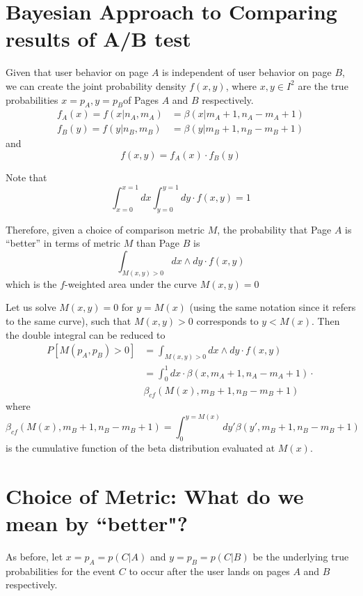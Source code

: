 \documentclass[12pt]{report}
\newcommand{\beq}{\begin{equation}} %
\newcommand{\eeq}{\end{equation}} %
\newcommand{\bdm}{\begin{displaymath}} %
\newcommand{\edm}{\end{displaymath}} %
\begin{document}
\section{Bayesian Approach to Comparing results of A/B test}\label{sec:bayesianab}
Given that user behavior on page \(A\) is independent of user behavior on
page \(B\), we
can create the joint probability density \(f(x, y)\), where \(x, y \in
I^2\) are the true probabilities \(x=p_A,y=p_B\)of Pages \(A\) and \(B\)
respectively.
\beq
\begin{split}
f_A(x)=f(x|n_A,m_A) &= \beta(x|m_A+1, n_A-m_A+1)\\ f_B(y)=f(y|n_B,m_B)
&= \beta(y|m_B+1, n_B-m_B+1)
\end{split}
\eeq
and
\bdm
f(x,y) = f_A(x)\cdot f_B(y)
\edm

Note that
\beq\label{eq:norm}
\int_{x=0}^{x=1} dx\int_{y=0}^{y=1} dy \cdot f(x, y) = 1
\eeq

Therefore, given a choice of comparison metric \(M\),
the probability that Page \(A\) is
``better'' in terms of metric \(M\) than Page \(B\) is 
\bdm
\int_{M(x,y)>0}dx \wedge dy \cdot f(x, y) \edm which is the \(f\)-weighted
area under the curve \(M(x,y) = 0\)

Let us solve \(M(x,y) = 0\) for \(y=M(x)\) (using the same notation
since it refers to the same curve), such that \(M(x,y) > 0\)
corresponds to \(y<M(x)\).  Then the double integral can be reduced to
\beq
\begin{split}
  P[M(p_A, p_B)>0] &= \int_{M(x,y)>0}dx \wedge dy \cdot f(x, y)\\
  &=
  \int_0^1dx\cdot \beta(x,m_A+1, n_A-m_A+1)\cdot\\
  &\beta_{cf}(M(x), m_B+1, n_B-m_B+1)
\end{split}
\eeq
where
\beq
\beta_{cf}(M(x), m_B+1, n_B-m_B+1)=
\int_0^{y=M(x)}dy'\beta(y',m_B+1, n_B-m_B+1)
\eeq
is the cumulative function of the beta distribution evaluated at \(M(x)\).

\section{Choice of Metric: What do we mean by ``better"?}\label{sec:metrics}
As before, let \(x= p_A = p(C|A)\) and \(y= p_B = p(C|B)\) be the underlying true probabilities for the event \(C\) to occur after the user lands on 
pages \(A\) and \(B\) respectively.
 
\end{document}
